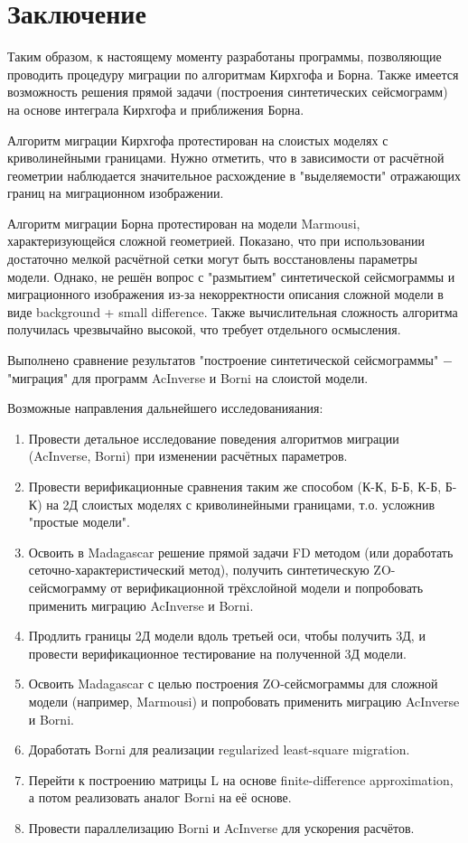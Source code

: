 \documentclass{article}
\begin{document}
\section{Заключение}

Таким образом, к настоящему моменту разработаны программы, позволяющие проводить процедуру миграции по алгоритмам Кирхгофа и Борна.
Также имеется возможность решения прямой задачи (построения синтетических сейсмограмм) на основе интеграла Кирхгофа и приближения Борна.

Алгоритм миграции Кирхгофа протестирован на слоистых моделях с криволинейными границами.
Нужно отметить, что в зависимости от расчётной геометрии наблюдается значительное расхождение в "выделяемости" отражающих границ на миграционном изображении.

Алгоритм миграции Борна протестирован на модели Marmousi, характеризующейся сложной геометрией.
Показано, что при использовании достаточно мелкой расчётной сетки могут быть восстановлены параметры модели.
Однако, не решён вопрос с "размытием" синтетической сейсмограммы и миграционного изображения из-за некорректности описания сложной модели в виде background + small difference.
Также вычислительная сложность алгоритма получилась чрезвычайно высокой, что требует отдельного осмысления.

Выполнено сравнение результатов "построение синтетической сейсмограммы" $-$ "миграция" для программ AcInverse и Borni на слоистой модели.

Возможные направления дальнейшего исследованияания: 

\begin{enumerate}
\item Провести детальное исследование поведения алгоритмов миграции (AcInverse, Borni) при изменении расчётных параметров.
\item Провести верификационные сравнения таким же способом (К-К, Б-Б, К-Б, Б-К) на 2Д слоистых моделях с криволинейными границами, т.о. усложнив "простые модели".
\item Освоить в Madagascar решение прямой задачи FD методом (или доработать сеточно-характеристический метод), получить синтетическую ZO-сейсмограмму от верификационной трёхслойной модели и попробовать применить миграцию AcInverse и Borni.
\item Продлить границы 2Д модели вдоль третьей оси, чтобы получить 3Д, и провести верификационное тестирование на полученной 3Д модели.
\item Освоить Madagascar с целью построения ZO-сейсмограммы для сложной модели (например, Marmousi) и попробовать применить миграцию AcInverse и Borni.
\item Доработать Borni для реализации regularized least-square migration.
\item Перейти к построению матрицы L на основе finite-difference approximation, а потом реализовать аналог Borni на её основе.
\item Провести параллелизацию Borni и AcInverse для ускорения расчётов.
\end{enumerate}
\end{document}
